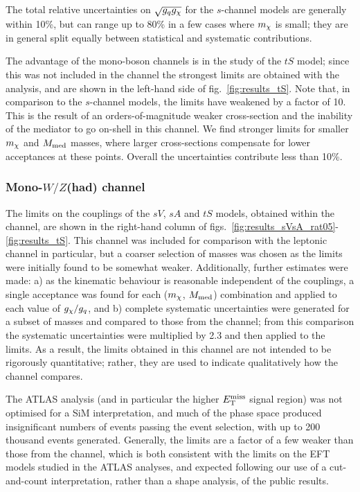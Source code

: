 The total relative uncertainties on $\sqrt{g_q g_{\chi}}$ for the $s$-channel models are generally within 10\%, but can range up to 80\% in a few cases where $m_{\chi}$ is small; they are in general split equally between statistical and systematic contributions.

The advantage of the mono-boson channels is in the study of the $tS$ model; since this was not included in the \monojet channel the strongest limits are obtained with the \monoZ analysis, and are shown in the left-hand side of fig.~\ref{fig:results_tS}. Note that, in comparison to the $s$-channel models, the limits have weakened by a factor of 10. This is the result of an orders-of-magnitude weaker cross-section and the inability of the mediator to go on-shell in this channel. We find stronger limits for smaller $m_{\chi}$ and $M_{\mathrm{med}}$ masses, where larger cross-sections compensate for lower acceptances at these points. Overall the uncertainties contribute less than 10\%.

\subsubsection{Mono-$W/Z$(had) channel}

The limits on the couplings of the $sV$, $sA$ and $tS$ models, obtained within the \monoWZ channel, are shown in the right-hand column of figs.~\ref{fig:results_sVsA_rat05}-\ref{fig:results_tS}. This channel was included for comparison with the leptonic \monoZ channel in particular, but a coarser selection of masses was chosen as the limits were initially found to be somewhat weaker. Additionally, further estimates were made: a) as the kinematic behaviour is reasonable independent of the couplings, a single acceptance was found for each ($m_{\chi}$, $M_{\mathrm{med}}$) combination and applied to each value of $g_{\chi} / g_q$, and b) complete systematic uncertainties were generated for a subset of masses and compared to those from the \monoZ channel; from this comparison the \monoZ systematic uncertainties were multiplied by 2.3 and then applied to the \monoWZ limits. As a result, the limits obtained in this channel are not intended to be rigorously quantitative; rather, they are used to indicate qualitatively how the channel compares.

The ATLAS \monoWZ analysis (and in particular the higher $E_{\mathrm{T}}^{\mathrm{miss}}$ signal region) was not optimised for a SiM interpretation, and much of the phase space produced insignificant numbers of events passing the event selection, with up to 200 thousand events generated. Generally, the limits are a factor of a few weaker than those from the \monoZ channel, which is both consistent with the limits on the EFT models studied in the ATLAS analyses, and expected following our use of a cut-and-count interpretation, rather than a shape analysis, of the \monoWZ public results.

